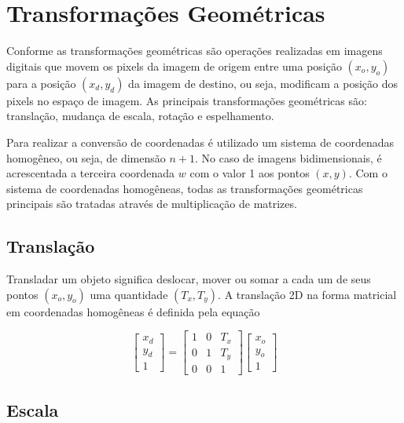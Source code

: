 \documentclass[12pt,oneside,a4paper,english,french,spanish,brazil,]{abntex2}
\begin{document}


\section{Transformações Geométricas}

Conforme \citet{conci:2003} as transformações geométricas são operações realizadas em imagens digitais que movem os pixels da imagem de origem entre uma posição \((x_o,y_o)\) para a posição \((x_d,y_d)\) da imagem de destino, ou seja, modificam a posição dos pixels no espaço de imagem. As principais transformações geométricas são: translação, mudança de escala, rotação e espelhamento.

Para realizar a conversão de coordenadas é utilizado um sistema de coordenadas homogêneo, ou seja, de dimensão \(n+1\). No caso de imagens bidimensionais, é acrescentada a terceira coordenada \(w\) com o valor 1 aos pontos \((x, y)\). Com o sistema de coordenadas homogêneas, todas as transformações geométricas principais são tratadas através de multiplicação de matrizes.

\subsection{Translação}

Transladar um objeto significa deslocar, mover ou somar a cada um de seus pontos \((x_o,y_o)\) uma quantidade \((T_x,T_y)\). A translação 2D na forma matricial em coordenadas homogêneas é definida pela equação

\[
\begin{bmatrix}
x_d\\ 
y_d\\ 
1
\end{bmatrix}
=
\begin{bmatrix}
1 & 0 & T_x\\ 
0 & 1 & T_y\\ 
0 & 0 & 1
\end{bmatrix}
\begin{bmatrix}
x_o\\ 
y_o\\ 
1
\end{bmatrix}
\]

\subsection{Escala}
\end{document}
